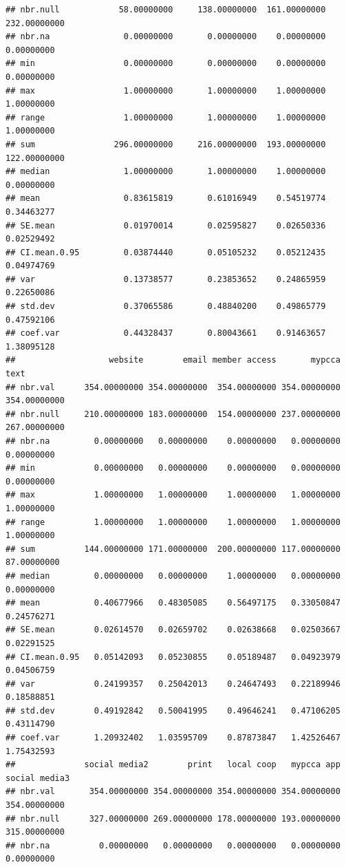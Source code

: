 \documentclass[
]{article}
\begin{document}
\begin{verbatim}
## nbr.null            58.00000000     138.00000000  161.00000000   232.00000000
## nbr.na               0.00000000       0.00000000    0.00000000     0.00000000
## min                  0.00000000       0.00000000    0.00000000     0.00000000
## max                  1.00000000       1.00000000    1.00000000     1.00000000
## range                1.00000000       1.00000000    1.00000000     1.00000000
## sum                296.00000000     216.00000000  193.00000000   122.00000000
## median               1.00000000       1.00000000    1.00000000     0.00000000
## mean                 0.83615819       0.61016949    0.54519774     0.34463277
## SE.mean              0.01970014       0.02595827    0.02650336     0.02529492
## CI.mean.0.95         0.03874440       0.05105232    0.05212435     0.04974769
## var                  0.13738577       0.23853652    0.24865959     0.22650086
## std.dev              0.37065586       0.48840200    0.49865779     0.47592106
## coef.var             0.44328437       0.80043661    0.91463657     1.38095128
##                   website        email member access       mypcca         text
## nbr.val      354.00000000 354.00000000  354.00000000 354.00000000 354.00000000
## nbr.null     210.00000000 183.00000000  154.00000000 237.00000000 267.00000000
## nbr.na         0.00000000   0.00000000    0.00000000   0.00000000   0.00000000
## min            0.00000000   0.00000000    0.00000000   0.00000000   0.00000000
## max            1.00000000   1.00000000    1.00000000   1.00000000   1.00000000
## range          1.00000000   1.00000000    1.00000000   1.00000000   1.00000000
## sum          144.00000000 171.00000000  200.00000000 117.00000000  87.00000000
## median         0.00000000   0.00000000    1.00000000   0.00000000   0.00000000
## mean           0.40677966   0.48305085    0.56497175   0.33050847   0.24576271
## SE.mean        0.02614570   0.02659702    0.02638668   0.02503667   0.02291525
## CI.mean.0.95   0.05142093   0.05230855    0.05189487   0.04923979   0.04506759
## var            0.24199357   0.25042013    0.24647493   0.22189946   0.18588851
## std.dev        0.49192842   0.50041995    0.49646241   0.47106205   0.43114790
## coef.var       1.20932402   1.03595709    0.87873847   1.42526467   1.75432593
##              social media2        print   local coop   mypcca app social media3
## nbr.val       354.00000000 354.00000000 354.00000000 354.00000000  354.00000000
## nbr.null      327.00000000 269.00000000 178.00000000 193.00000000  315.00000000
## nbr.na          0.00000000   0.00000000   0.00000000   0.00000000    0.00000000

\end{verbatim}
\end{document}
